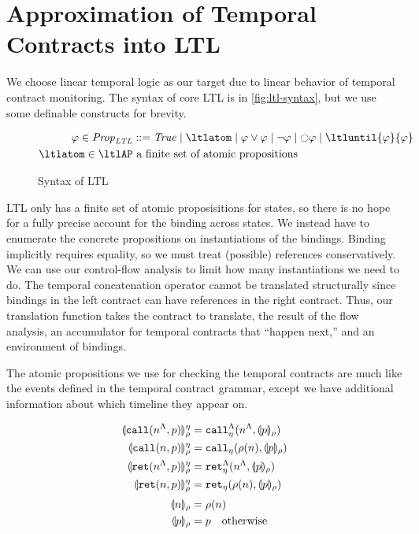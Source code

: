\documentclass[preprint,onecolumn,9pt]{sigplanconf} %
\begin{document}
\section{Approximation of Temporal Contracts into LTL}

We choose linear temporal logic as our target due to linear behavior of temporal contract monitoring.
%
The syntax of core LTL is in \autoref{fig:ltl-syntax}, but we use some definable constructs for brevity.
%
\begin{figure}
  \begin{align*}
    \ltlprop \in \LTLProp &::= \ltlTrue \alt \ltlatom \alt \ltlor{\ltlprop}{\ltlprop} \alt \ltlnot{\ltlprop} \alt \ltlnext{\ltlprop} \alt \ltluntil{\ltlprop}{\ltlprop}
\\
    \ltlatom \in \ltlAP & \text{ a finite set of atomic propositions}
  \end{align*}
  \caption{Syntax of LTL}
  \label{fig:ltl-syntax}
\end{figure}
LTL only has a finite set of atomic proposisitions for states, so there is no hope for a fully precise account for the binding across states.
%
We instead have to enumerate the concrete propositions on instantiations of the bindings.
%
Binding implicitly requires equality, so we must treat (possible) references conservatively.
%
We can use our control-flow analysis to limit how many instantiations we need to do.
%
The temporal concatenation operator cannot be translated structurally since bindings in the left contract can have references in the right contract.
%
Thus, our translation function takes the contract to translate, the result of the flow analysis, an accumulator for temporal contracts that ``happen next,'' and an environment of bindings.

The atomic propositions we use for checking the temporal contracts are much like the events defined in the temporal contract grammar, except we have additional information about which timeline they appear on.

\begin{align*}
  \llparenthesis {\tt call}(n^\Lambda, p) \rrparenthesis_{\rho}^{\eta} &=
    {\tt call}_{\eta}^{\Lambda}(n^\Lambda,\llparenthesis p \rrparenthesis_{\rho})
\\
  \llparenthesis {\tt call}(n, p) \rrparenthesis_{\rho}^{\eta} &=
    {\tt call}_{\eta}(\rho(n),\llparenthesis p \rrparenthesis_{\rho})
\\
  \llparenthesis {\tt ret}(n^\Lambda, p) \rrparenthesis_{\rho}^{\eta} &=
    {\tt ret}_{\eta}^{\Lambda}(n^\Lambda,\llparenthesis p \rrparenthesis_{\rho})
\\
  \llparenthesis {\tt ret}(n, p) \rrparenthesis_{\rho}^{\eta} &=
    {\tt ret}_{\eta}(\rho(n),\llparenthesis p \rrparenthesis_{\rho})
\\[2pt]
  \llparenthesis n \rrparenthesis_{\rho} &= \rho(n)
\\
  \llparenthesis p \rrparenthesis_{\rho} &= p \quad\text{otherwise}
\end{align*}
\end{document}
